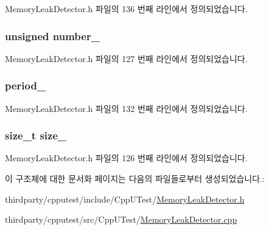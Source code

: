 Memory\+Leak\+Detector.\+h 파일의 136 번째 라인에서 정의되었습니다.

\subsubsection[{\texorpdfstring{number\+\_\+}{number_}}]{\setlength{\rightskip}{0pt plus 5cm}unsigned number\+\_\+}\hypertarget{struct_memory_leak_detector_node_aa14f02a32a8cc537af13ce5397fcd2b1}{}\label{struct_memory_leak_detector_node_aa14f02a32a8cc537af13ce5397fcd2b1}


Memory\+Leak\+Detector.\+h 파일의 127 번째 라인에서 정의되었습니다.

\subsubsection[{\texorpdfstring{period\+\_\+}{period_}}]{ period\+\_\+}\hypertarget{struct_memory_leak_detector_node_a4b296dc99cd64623a83ce9027f70e0e7}{}\label{struct_memory_leak_detector_node_a4b296dc99cd64623a83ce9027f70e0e7}


Memory\+Leak\+Detector.\+h 파일의 132 번째 라인에서 정의되었습니다.

\subsubsection[{\texorpdfstring{size\+\_\+}{size_}}]{\setlength{\rightskip}{0pt plus 5cm}size\+\_\+t size\+\_\+}\hypertarget{struct_memory_leak_detector_node_a5f31775800bbb46b35b5791def1f3acc}{}\label{struct_memory_leak_detector_node_a5f31775800bbb46b35b5791def1f3acc}


Memory\+Leak\+Detector.\+h 파일의 126 번째 라인에서 정의되었습니다.



이 구조체에 대한 문서화 페이지는 다음의 파일들로부터 생성되었습니다.\+:\begin{DoxyCompactItemize}
\item 
thirdparty/cpputest/include/\+Cpp\+U\+Test/\hyperlink{_memory_leak_detector_8h}{Memory\+Leak\+Detector.\+h}\item 
thirdparty/cpputest/src/\+Cpp\+U\+Test/\hyperlink{_memory_leak_detector_8cpp}{Memory\+Leak\+Detector.\+cpp}\end{DoxyCompactItemize}
